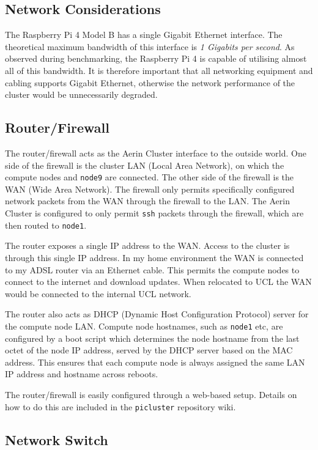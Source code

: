 %
%
\subsection{Network Considerations}

The Raspberry Pi 4 Model B has a single Gigabit Ethernet interface. The theoretical maximum bandwidth of this interface is \emph{1 Gigabits per second}. As observed during benchmarking, the Raspberry Pi 4 is capable of utilising almost all of this bandwidth. It is therefore important that all networking equipment and cabling supports Gigabit Ethernet, otherwise the network performance of the cluster would be unnecessarily degraded.


%
%
\subsection{Router/Firewall}
The router/firewall acts as the Aerin Cluster interface to the outside world. One side of the firewall is the cluster LAN (Local Area Network), on which the compute nodes and \verb|node9| are connected. The other side of the firewall is the WAN (Wide Area Network). The firewall only permits specifically configured network packets from the WAN through the firewall to the LAN. The Aerin Cluster is configured to only permit \verb|ssh| packets through the firewall, which are then routed to \verb|node1|.

The router exposes a single IP address to the WAN. Access to the cluster is through this single IP address. In my home environment the WAN is connected to my ADSL router via an Ethernet cable. This permits the compute nodes to connect to the internet and download updates. When relocated to UCL the WAN would be connected to the internal UCL network.

The router also acts as DHCP (Dynamic Host Configuration Protocol) server for the compute node LAN. Compute node hostnames, such as \verb|node1| etc, are configured by a boot script which determines the node hostname from the last octet of the node IP address, served by the DHCP server based on the MAC address. This ensures that each compute node is always assigned the same LAN IP address and hostname across reboots.

The router/firewall is easily configured through a web-based setup. Details on how to do this are included in the \verb|picluster| repository wiki.


%
%
\subsection{Network Switch}

